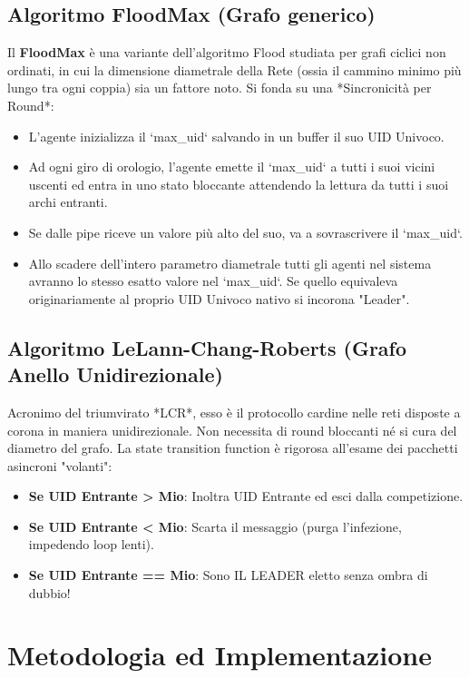 \documentclass[a4paper,12pt]{article}
\begin{document}
\subsection{Algoritmo FloodMax (Grafo generico)}
Il \textbf{FloodMax} è una variante dell'algoritmo Flood studiata per grafi ciclici non ordinati, in cui la dimensione diametrale della Rete (ossia il cammino minimo più lungo tra ogni coppia) sia un fattore noto. 
Si fonda su una *Sincronicità per Round*:
\begin{itemize}
    \item L'agente inizializza il `max\_uid` salvando in un buffer il suo UID Univoco.
    \item Ad ogni giro di orologio, l'agente emette il `max\_uid` a tutti i suoi vicini uscenti ed entra in uno stato bloccante attendendo la lettura da tutti i suoi archi entranti.
    \item Se dalle pipe riceve un valore più alto del suo, va a sovrascrivere il `max\_uid`.
    \item Allo scadere dell'intero parametro diametrale tutti gli agenti nel sistema avranno lo stesso esatto valore nel `max\_uid`. Se quello equivaleva originariamente al proprio UID Univoco nativo si incorona "Leader".
\end{itemize}

\subsection{Algoritmo LeLann-Chang-Roberts (Grafo Anello Unidirezionale)}
Acronimo del triumvirato *LCR*, esso è il protocollo cardine nelle reti disposte a corona in maniera unidirezionale. Non necessita di round bloccanti né si cura del diametro del grafo. La state transition function è rigorosa all'esame dei pacchetti asincroni "volanti":
\begin{itemize}
    \item \textbf{Se UID Entrante > Mio}: Inoltra UID Entrante ed esci dalla competizione.
    \item \textbf{Se UID Entrante < Mio}: Scarta il messaggio (purga l'infezione, impedendo loop lenti).
    \item \textbf{Se UID Entrante == Mio}: Sono IL LEADER eletto senza ombra di dubbio!
\end{itemize}

\section{Metodologia ed Implementazione}
\end{document}

